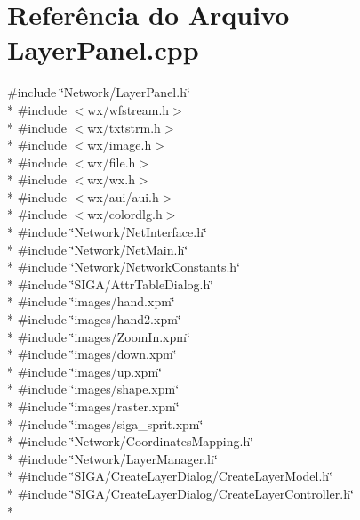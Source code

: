 \section{Referência do Arquivo Layer\+Panel.\+cpp}
\label{_layer_panel_8cpp}
{\ttfamily \#include \char`\"{}Network/\+Layer\+Panel.\+h\char`\"{}}\\*
{\ttfamily \#include $<$wx/wfstream.\+h$>$}\\*
{\ttfamily \#include $<$wx/txtstrm.\+h$>$}\\*
{\ttfamily \#include $<$wx/image.\+h$>$}\\*
{\ttfamily \#include $<$wx/file.\+h$>$}\\*
{\ttfamily \#include $<$wx/wx.\+h$>$}\\*
{\ttfamily \#include $<$wx/aui/aui.\+h$>$}\\*
{\ttfamily \#include $<$wx/colordlg.\+h$>$}\\*
{\ttfamily \#include \char`\"{}Network/\+Net\+Interface.\+h\char`\"{}}\\*
{\ttfamily \#include \char`\"{}Network/\+Net\+Main.\+h\char`\"{}}\\*
{\ttfamily \#include \char`\"{}Network/\+Network\+Constants.\+h\char`\"{}}\\*
{\ttfamily \#include \char`\"{}S\+I\+G\+A/\+Attr\+Table\+Dialog.\+h\char`\"{}}\\*
{\ttfamily \#include \char`\"{}images/hand.\+xpm\char`\"{}}\\*
{\ttfamily \#include \char`\"{}images/hand2.\+xpm\char`\"{}}\\*
{\ttfamily \#include \char`\"{}images/\+Zoom\+In.\+xpm\char`\"{}}\\*
{\ttfamily \#include \char`\"{}images/down.\+xpm\char`\"{}}\\*
{\ttfamily \#include \char`\"{}images/up.\+xpm\char`\"{}}\\*
{\ttfamily \#include \char`\"{}images/shape.\+xpm\char`\"{}}\\*
{\ttfamily \#include \char`\"{}images/raster.\+xpm\char`\"{}}\\*
{\ttfamily \#include \char`\"{}images/siga\+\_\+sprit.\+xpm\char`\"{}}\\*
{\ttfamily \#include \char`\"{}Network/\+Coordinates\+Mapping.\+h\char`\"{}}\\*
{\ttfamily \#include \char`\"{}Network/\+Layer\+Manager.\+h\char`\"{}}\\*
{\ttfamily \#include \char`\"{}S\+I\+G\+A/\+Create\+Layer\+Dialog/\+Create\+Layer\+Model.\+h\char`\"{}}\\*
{\ttfamily \#include \char`\"{}S\+I\+G\+A/\+Create\+Layer\+Dialog/\+Create\+Layer\+Controller.\+h\char`\"{}}\\*
